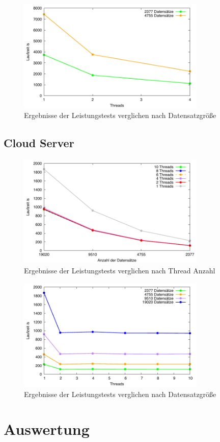 \begin{figure}[htbp!]
\centering
\includegraphics[width=0.8\textwidth]{../results/plots/raspberrypi3/comp_all_partitions.pdf}
\caption{Ergebnisse der Leistungstests verglichen nach Datensatzgröße}
\label{fig:raspi_benchmark_partitions}
\end{figure}

\subsection{Cloud Server}

\begin{figure}[H]
\centering
\includegraphics[width=0.8\textwidth]{../results/plots/vps/comp_all_threads.pdf}
\caption{Ergebnisse der Leistungstests verglichen nach Thread Anzahl}
\label{fig:vps_benchmark_threads}
\end{figure}

\begin{figure}[htbp!]
\centering
\includegraphics[width=0.8\textwidth]{../results/plots/vps/comp_all_partitions.pdf}
\caption{Ergebnisse der Leistungstests verglichen nach Datensatzgröße}
\label{fig:vps_benchmark_partitions}
\end{figure}

\section{Auswertung}



